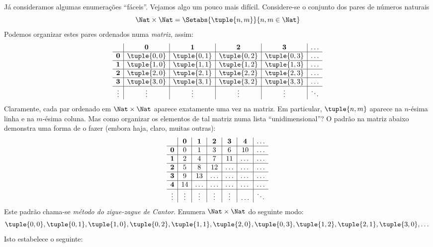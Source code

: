 \documentclass[../../../include/open-logic-section]{subfiles}
\begin{document}


\begin{explain}
Já consideramos algumas enumerações ``fáceis''. Vejamos algo um pouco mais
difícil. Considere-se o conjunto dos pares de números
naturais
\[
\Nat \times \Nat = \Setabs{\tuple{n,m}}{n,m \in \Nat}
\]
Podemos organizar estes pares ordenados numa \emph{matriz}, assim:
\[
\begin{array}{ c | c | c | c | c | c}
& \mathbf 0 & \mathbf 1 & \mathbf 2 & \mathbf 3 & \dots \\
\hline
\mathbf 0 & \tuple{0,0} & \tuple{0,1} & \tuple{0,2} & \tuple{0,3} & \dots \\
\hline
\mathbf 1 & \tuple{1,0} & \tuple{1,1} & \tuple{1,2} & \tuple{1,3} & \dots \\
\hline
\mathbf 2 & \tuple{2,0} & \tuple{2,1} & \tuple{2,2} & \tuple{2,3} & \dots \\
\hline
\mathbf 3 & \tuple{3,0} & \tuple{3,1} & \tuple{3,2} & \tuple{3,3} & \dots \\
\hline
\vdots & \vdots & \vdots & \vdots & \vdots & \ddots\\
\end{array}
\]
Claramente, cada par ordenado em $\Nat \times \Nat$ aparece exatamente
uma vez na matriz. Em particular, $\tuple{n,m}$ aparece na $n$-ésima linha e na
$m$-ésima coluna. Mas como organizar os elementos de tal matriz numa lista
``unidimensional''? O padrão na matriz abaixo demonstra uma forma de o fazer (embora
haja, claro, muitas outras):
\[
\begin{array}{ c | c | c | c | c | c | c}
& \mathbf 0 & \mathbf 1 & \mathbf 2 & \mathbf 3 & \mathbf 4 &\dots \\
\hline
\mathbf 0 & 0  & 1& 3 & 6& 10 &\ldots \\
\hline
\mathbf 1 &2 & 4& 7 & 11 & \dots &\ldots \\
\hline
\mathbf 2 & 5 & 8 & 12 & \ldots & \dots&\ldots \\
\hline
\mathbf 3 & 9 & 13 & \ldots & \ldots & \dots & \ldots \\
\hline
\mathbf 4 & 14 & \ldots & \ldots & \ldots & \dots & \ldots \\
\hline
\vdots & \vdots & \vdots & \vdots & \vdots&\ldots & \ddots\\
\end{array}
\]\noindent
Este padrão chama-se \emph{método do zigue-zague de Cantor}. Enumera
$\Nat \times \Nat$ do seguinte modo:
\[
\tuple{0,0}, \tuple{0,1}, \tuple{1,0}, \tuple{0,2}, \tuple{1,1},
\tuple{2,0}, \tuple{0,3}, \tuple{1,2}, \tuple{2,1}, \tuple{3,0}, \dots
\]
Isto estabelece o seguinte:
\end{explain}
\end{document}
